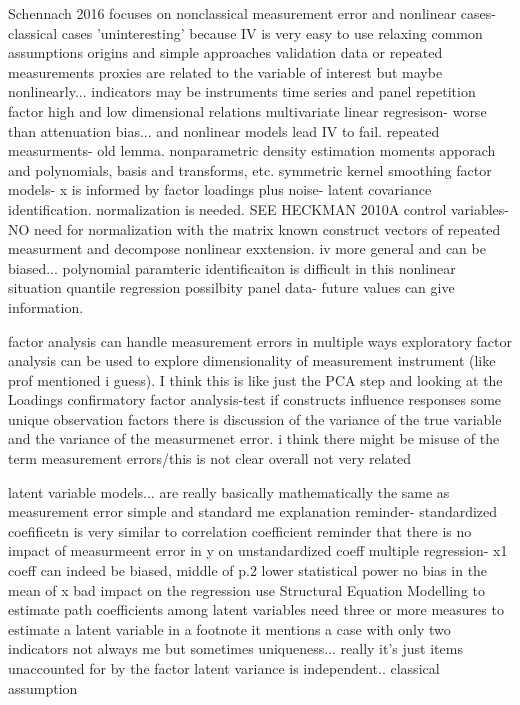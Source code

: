 \documentclass[12pt]{article}
\begin{document}
        Schennach 2016
        focuses on nonclassical measurement error and nonlinear cases- classical cases 'uninteresting' because IV is very easy to use
        relaxing common assumptions
        origins and simple approaches
        validation data or repeated measurements
        proxies are related to the variable of interest but maybe nonlinearly... indicators may be instruments
        time series and panel repetition
        factor high and low dimensional relations
        multivariate linear regresison- worse than attenuation bias... and nonlinear models lead IV to fail.
        repeated measurments- old lemma. nonparametric density estimation
        moments apporach and polynomials, basis and transforms, etc.
        symmetric kernel smoothing
        factor models- x is informed by factor loadings plus noise- latent
        covariance identification. normalization is needed.
        SEE HECKMAN 2010A
        control variables- NO need for normalization
        with the matrix known construct vectors of repeated measurment and decompose
        nonlinear exxtension.
        iv more general and can be biased... polynomial paramteric
        identificaiton is difficult in this nonlinear situation
        quantile regression possilbity
        panel data- future values can give information.

        factor analysis can handle measurement errors in multiple ways
        exploratory factor analysis can be used to explore dimensionality of measurement instrument (like prof mentioned i guess). I think this is like just the PCA step and looking at the Loadings
        confirmatory factor analysis-test if constructs influence responses
        some unique observation factors
        there is discussion of the variance of the true variable and the variance of the measurmenet error.
        i think there might be misuse of the term measurement errors/this is not clear
        overall not very related

        latent variable models... are really basically mathematically the same as measurement error
        simple and standard me explanation
        reminder- standardized coefificetn is very similar to correlation coefficient
        reminder that there is no impact of measurmeent error in y on unstandardized coeff
        multiple regression- x1 coeff can indeed be biased, middle of p.2
        lower statistical power
        no bias in the mean of x
        bad impact on the regression
        use Structural Equation Modelling to estimate path coefficients among latent variables
        need three or more measures to estimate a latent variable
        in a footnote it mentions a case with only two indicators
        not always me but sometimes uniqueness... really it's just items unaccounted for by the factor
        latent variance is independent.. classical assumption
\end{document}
